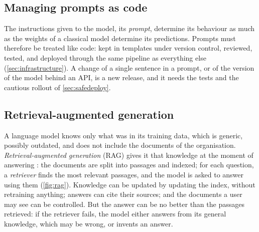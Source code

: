 \subsection{Managing prompts as code}

The instructions given to the model, its \emph{prompt}, determine its behaviour as much as the weights of a classical
model determine its predictions. Prompts must therefore be treated like code: kept in templates under version control,
reviewed, tested, and deployed through the same pipeline as everything else (\cref{sec:infrastructure}). A change of a
single sentence in a prompt, or of the version of the model behind an API, is a new release, and it needs the tests and
the cautious rollout of \cref{sec:safedeploy}.

\subsection{Retrieval-augmented generation}

A language model knows only what was in its training data, which is generic, possibly outdated, and does not include the
documents of the organisation. \emph{Retrieval-augmented generation} (RAG) gives it that knowledge at the moment of answering
\citep{lewis2020retrieval}: the documents are split into passages and indexed; for each question, a \emph{retriever} finds the
most relevant passages, and the model is asked to answer using them (\cref{fig:rag}). Knowledge can be updated by updating the
index, without retraining anything; answers can cite their sources; and the documents a user may see can be controlled. But the
answer can be no better than the passages retrieved: if the retriever fails, the model either answers from its general knowledge,
which may be wrong, or invents an answer.

